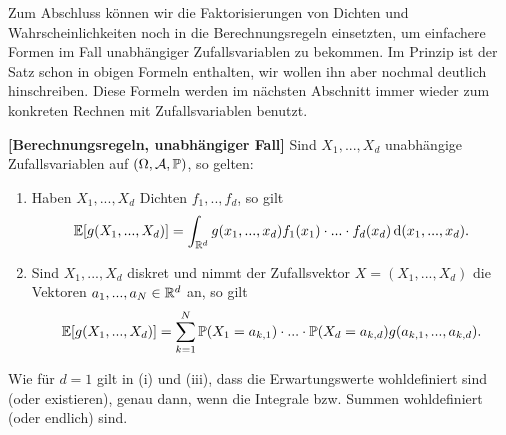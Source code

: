 Zum Abschluss k\"onnen wir die Faktorisierungen von Dichten und Wahrscheinlichkeiten noch in die Berechnungsregeln einsetzten, um einfachere Formen im Fall unabh\"angiger Zufallsvariablen zu bekommen. Im Prinzip ist der Satz schon in obigen Formeln enthalten, wir wollen ihn aber nochmal deutlich hinschreiben. Diese Formeln werden im n\"achsten Abschnitt immer wieder zum konkreten Rechnen mit Zufallsvariablen benutzt.
\begin{satz}\label{ber}
 \textbf{[Berechnungsregeln, unabh\"angiger Fall]}
Sind $X_1,...,X_d$ unabh\"angige Zufallsvariablen auf $(\Omega, \mathcal{A}, \mathbb{P})$, so gelten:
	\begin{enumerate}[label=(\roman*)]
		\item Haben $X_1,...,X_d$ Dichten $f_1,..,f_d$, so gilt
			\[ \mathbb{E}[g(X_1,...,X_d)] =\int_{\mathbb{R}^d}g(x_1,...,x_d) f_1(x_1)\cdot...\cdot f_d(x_d) \, \mathrm{d} (x_1,...,x_d).  \]
		\item Sind $X_1,...,X_d$ diskret und nimmt der Zufallsvektor $X=(X_1,...,X_d)$ die Vektoren $a_1, ..., a_N\in\mathbb{R}^d$  an, so gilt
		\[ \mathbb{E}[g(X_1,...,X_d)]= \sum\limits_{k=1}^{N} \mathbb{P}(X_1=a_{k,1})\cdot ...\cdot  \mathbb{P}(X_d=a_{k,d})g(a_{k,1},...,a_{k,d}) . \]
	\end{enumerate}
	Wie f\"ur $d=1$ gilt in (i) und (iii), dass die Erwartungswerte wohldefiniert sind (oder existieren), genau dann, wenn die Integrale bzw. Summen wohldefiniert (oder endlich) sind.
\end{satz}



